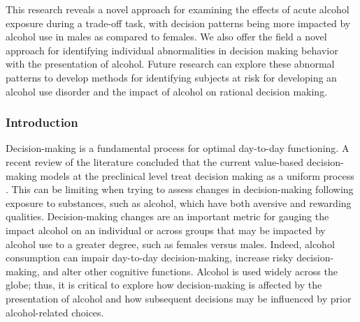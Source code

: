 \documentclass{article}
\begin{document}
\vspace{1em}
 
This research reveals a novel approach for examining the effects of acute alcohol exposure during a trade-off task, with decision patterns being more impacted by alcohol use in males as compared to females. We also offer the field a novel approach for identifying individual abnormalities in decision making behavior with the presentation of alcohol. Future research can explore these abnormal patterns to develop methods for identifying subjects at risk for developing an alcohol use disorder and the impact of alcohol on rational decision making.

\clearpage

\subsubsection{Introduction}
Decision-making is a fundamental process for optimal day-to-day functioning. A recent review of the literature concluded that the current value-based decision-making models at the preclinical level treat decision making as a uniform process \cite{orsini2019deconstructing}. This can be limiting when trying to assess changes in decision-making following exposure to substances, such as alcohol, which have both aversive and rewarding qualities. Decision-making changes are an important metric for gauging the impact alcohol on an individual or across groups that may be impacted by alcohol use to a greater degree, such as females versus males\cite{flores2020sex}. Indeed, alcohol consumption can impair day-to-day decision-making\cite{bechara2005decision}, increase risky decision-making\cite{fein2004impairment, lane2004alcohol, george2005acute, noel2007response, bidwell2013biphasic, kornreich2013polysubstance, brevers2014impaired, hwa2011persistent, aguirre2020sex, burnette2021diminished}, and alter other cognitive functions\cite{weissenborn2003acute, field2010acute, dry2012dose, van2019acute}. Alcohol is used widely across the globe\cite{degenhardt2008toward, rehm2016should}; thus, it is critical to explore how decision-making is affected by the presentation of alcohol and how subsequent decisions may be influenced by prior alcohol-related choices.

\vspace{1em}
\end{document}
